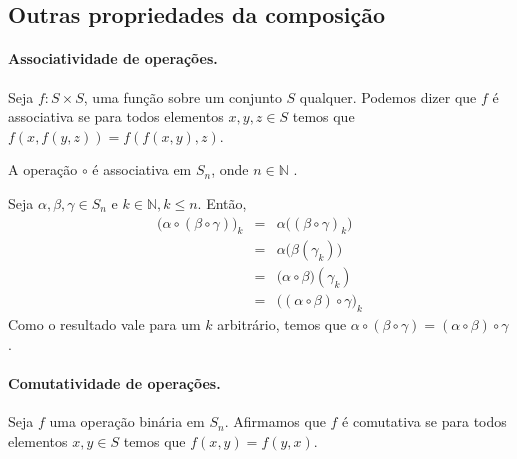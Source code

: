 \subsection{Outras propriedades da composição}

\paragraph{Associatividade de operações.}
Seja $f: S \times S$, uma função sobre um conjunto $S$ qualquer. Podemos dizer que $f$ é associativa se para todos elementos $x, y, z \in S$ temos que $f(x, f(y, z)) = f(f(x, y), z)$.


\begin{prop}
\label{prop2}
    A operação $\circ$ é associativa em $S_n$, onde $n \in \mathbb{N}$ .
\end{prop}

\begin{prova}
    Seja $\alpha, \beta, \gamma \in S_n$ e $k \in \mathbb{N}, k \leq n$. Então, 
    \begin{eqnarray*}
     \Big( \alpha \circ  (\beta \circ \gamma) \Big) _k & = & 
     \alpha \Big( (\beta \circ \gamma) _k \Big)\\ & = & 
     \alpha \Big( \beta (\gamma_k) \Big)\\ 
     & = & \Big( \alpha \circ \beta \Big) (\gamma_k) \\
     & = & \Big( (\alpha \circ \beta) \circ \gamma \Big) _k
    \end{eqnarray*}
    Como o resultado vale para um $k$ arbitrário, temos que
    $\alpha \circ  (\beta \circ \gamma) = (\alpha \circ \beta) \circ \gamma$.
\end{prova}



\paragraph{Comutatividade de operações.}
Seja $f$ uma operação binária em $S_n$. Afirmamos que $f$ é comutativa se para todos elementos $x, y \in S$ temos que $f(x, y) = f(y, x)$.

